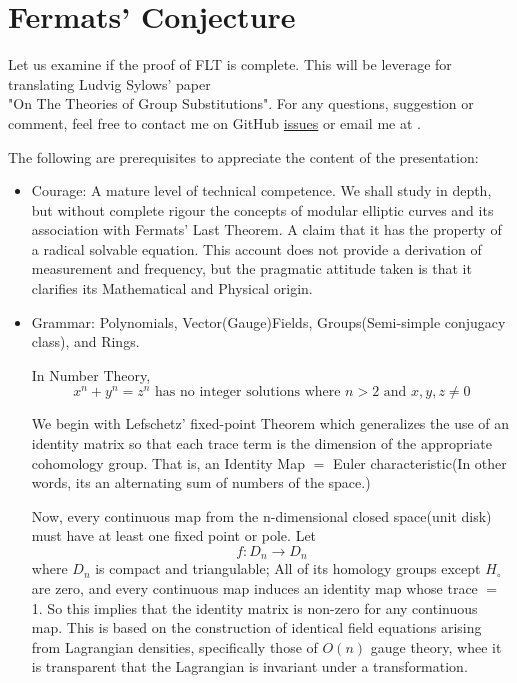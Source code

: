 \documentclass[11pt,fancy]{elegantbook}
\begin{document}
\chapter{Fermats' Conjecture}
Let us examine if the proof of FLT is complete. This will be leverage for translating Ludvig Sylows' paper \\ 
"On The Theories of Group Substitutions". For any questions, suggestion or comment, feel free to contact me on GitHub \href{https://github.com/StevenOwino}{issues} or email me at .

The following are prerequisites to appreciate the content of the presentation:
\begin{itemize}
  \item Courage: A mature level of technical competence. We shall study in depth, but without complete rigour the concepts of modular elliptic curves and its association with Fermats' Last Theorem. A claim that it has the property of a radical solvable equation. This account does not provide a derivation of measurement and frequency, but the pragmatic attitude taken is that it clarifies its Mathematical and Physical origin.   
  \item Grammar: Polynomials, Vector(Gauge)Fields, Groups(Semi-simple conjugacy class), and Rings.

  In Number Theory, 
  \begin{equation}
   x^n + y^n = z^n \text{ has no integer solutions where } n > 2 \text{ and }
   x,y,z\neq0
   \end{equation}
  
  We begin with Lefschetz' fixed-point Theorem which generalizes the use of an identity matrix so that each trace term is the dimension of the appropriate cohomology group. That is, an Identity Map ${=}$ Euler characteristic(In other words, its an alternating sum of numbers of the space.) 

  Now, every continuous map from the n-dimensional closed space(unit disk) must have at least one fixed point or pole. 
  Let 
  \begin{equation}
  f: {D_n} \to {D_n} 
  \end{equation} 
  where ${D_n}$ is compact and triangulable; All of its homology groups except ${H_{\circ}}$ are zero, and every continuous map induces an identity map whose trace ${=}$ 1. So this implies that the identity matrix is non-zero for any continuous map.
  This is based on the construction of identical field equations arising from Lagrangian densities, specifically those of ${O(n)}$ gauge theory, whee it is transparent that the Lagrangian is invariant under a transformation.
\end{itemize}
\end{document}

